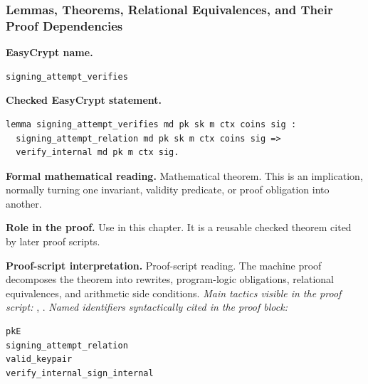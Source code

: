 \subsubsection*{Lemmas, Theorems, Relational Equivalences, and Their Proof Dependencies}
\begin{formaltheorem}
\noindent\textbf{EasyCrypt name.}
\begin{lstlisting}[language=EasyCrypt,basicstyle=\ttfamily\scriptsize]
signing_attempt_verifies
\end{lstlisting}
\noindent\textbf{Checked EasyCrypt statement.}
\begin{lstlisting}[language=EasyCrypt,basicstyle=\ttfamily\scriptsize]
lemma signing_attempt_verifies md pk sk m ctx coins sig :
  signing_attempt_relation md pk sk m ctx coins sig =>
  verify_internal md pk m ctx sig.
\end{lstlisting}
\noindent\textbf{Formal mathematical reading.}
Mathematical theorem. This is an implication, normally turning one invariant, validity predicate, or proof obligation into another.

\noindent\textbf{Role in the proof.}
Use in this chapter. It is a reusable checked theorem cited by later proof scripts.

\noindent\textbf{Proof-script interpretation.}
Proof-script reading. The machine proof decomposes the theorem into rewrites, program-logic obligations, relational equivalences, and arithmetic side conditions.
\emph{Main tactics visible in the proof script:} , .
\emph{Named identifiers syntactically cited in the proof block:}
\begin{lstlisting}[language=EasyCrypt,basicstyle=\ttfamily\scriptsize]
pkE
signing_attempt_relation
valid_keypair
verify_internal_sign_internal
\end{lstlisting}

\end{formaltheorem}


